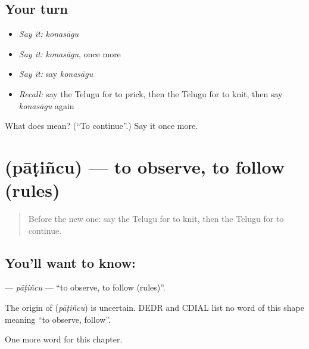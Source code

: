 \subsection*{Your turn}
\begin{itemize}
\raggedright
  \item \emph{Say it:} \emph{konasāgu}
  \item \emph{Say it:} \emph{konasāgu}, once more
  \item \emph{Say it:} say \emph{konasāgu}
  \item \emph{Recall:} say the Telugu for to prick, then the Telugu for to knit, then say \emph{konasāgu} again
\end{itemize}

\begin{tcolorbox}[breakable,colback=teal!4,colframe=teal!35!black,title={Before you move on}]
What does  mean? (\textquotedblleft{}To continue\textquotedblright{}.) Say it once more.
\end{tcolorbox}
\section[\texorpdfstring{\te{పాటించు} (pāṭiñcu)}{పాటించు (pāṭiñcu)}]{ (pāṭiñcu) — to observe, to follow (rules)}

\label{lesson:TE-C166-patincu}



\begin{quote}
Before the new one: say the Telugu for to knit, then the Telugu for to continue.
\end{quote}

\subsection*{You'll want to know: }
\textbf{} — \emph{pāṭiñcu} — \textquotedblleft{}to observe, to follow (rules)\textquotedblright{}.

\begin{cousinweb}
The origin of \textbf{} (\emph{pāṭiñcu}) is uncertain. DEDR and CDIAL list no word of this shape meaning \textquotedblleft{}to observe, follow\textquotedblright{}.
\end{cousinweb}

\begin{grammarlens}[title={What you've built}]
One more word for this chapter.
\end{grammarlens}

